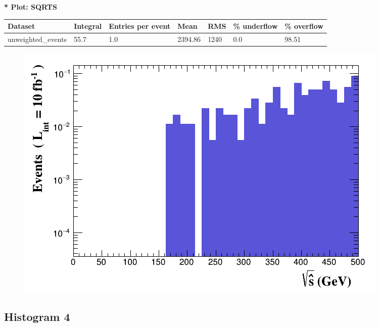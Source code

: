 \documentclass[a4paper, 10pt]{article}
\begin{document}
\textbf{* Plot: SQRTS}\\
   \begin{table}[H]
  \begin{center}
    \begin{tabular}{|m{23.0mm}|m{23.0mm}|m{18.0mm}|m{19.0mm}|m{19.0mm}|m{19.0mm}|m{19.0mm}|}
      \hline
      {\cellcolor{yellow}         Dataset}& {\cellcolor{yellow}         Integral}& {\cellcolor{yellow}         Entries per event}& {\cellcolor{yellow}         Mean}& {\cellcolor{yellow}         RMS}& {\cellcolor{yellow}         \% underflow}& {\cellcolor{yellow}         \% overflow}\\
      \hline
      {\cellcolor{white}         unweighted\_events}& {\cellcolor{white}         55.7}& {\cellcolor{white}         1.0}& {\cellcolor{white}         2394.86}& {\cellcolor{white}         1240}& {\cellcolor{red}         0.0}& {\cellcolor{red}         98.51}\\
\hline
    \end{tabular}
  \end{center}
\end{table}

\begin{figure}[H]
  \begin{center}
    \includegraphics[scale=0.45]{selection_2.png}\\
\caption{   }
  \end{center}
\end{figure}
      \newpage
\subsection{ Histogram 4}
\end{document}
